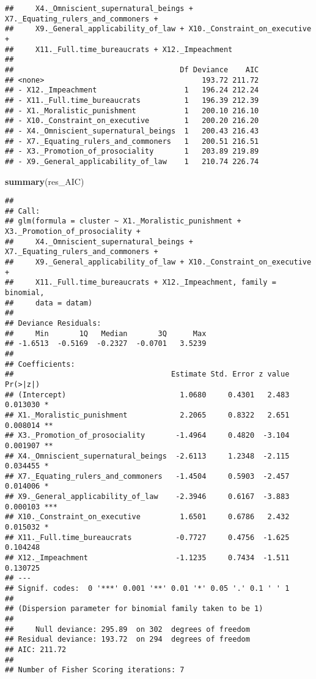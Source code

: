 \documentclass[
]{article}
\newenvironment{Shaded}{\begin{snugshade}}{\end{snugshade}}
\newcommand{\KeywordTok}[1]{\textcolor[rgb]{0.13,0.29,0.53}{\textbf{#1}}}
\newcommand{\NormalTok}[1]{#1}
\begin{document}
\begin{verbatim}
##     X4._Omniscient_supernatural_beings + X7._Equating_rulers_and_commoners + 
##     X9._General_applicability_of_law + X10._Constraint_on_executive + 
##     X11._Full.time_bureaucrats + X12._Impeachment
## 
##                                      Df Deviance    AIC
## <none>                                    193.72 211.72
## - X12._Impeachment                    1   196.24 212.24
## - X11._Full.time_bureaucrats          1   196.39 212.39
## - X1._Moralistic_punishment           1   200.10 216.10
## - X10._Constraint_on_executive        1   200.20 216.20
## - X4._Omniscient_supernatural_beings  1   200.43 216.43
## - X7._Equating_rulers_and_commoners   1   200.51 216.51
## - X3._Promotion_of_prosociality       1   203.89 219.89
## - X9._General_applicability_of_law    1   210.74 226.74
\end{verbatim}

\begin{Shaded}
\begin{Highlighting}[]
\KeywordTok{summary}\NormalTok{(res_AIC)}
\end{Highlighting}
\end{Shaded}

\begin{verbatim}
## 
## Call:
## glm(formula = cluster ~ X1._Moralistic_punishment + X3._Promotion_of_prosociality + 
##     X4._Omniscient_supernatural_beings + X7._Equating_rulers_and_commoners + 
##     X9._General_applicability_of_law + X10._Constraint_on_executive + 
##     X11._Full.time_bureaucrats + X12._Impeachment, family = binomial, 
##     data = datam)
## 
## Deviance Residuals: 
##     Min       1Q   Median       3Q      Max  
## -1.6513  -0.5169  -0.2327  -0.0701   3.5239  
## 
## Coefficients:
##                                    Estimate Std. Error z value Pr(>|z|)    
## (Intercept)                          1.0680     0.4301   2.483 0.013030 *  
## X1._Moralistic_punishment            2.2065     0.8322   2.651 0.008014 ** 
## X3._Promotion_of_prosociality       -1.4964     0.4820  -3.104 0.001907 ** 
## X4._Omniscient_supernatural_beings  -2.6113     1.2348  -2.115 0.034455 *  
## X7._Equating_rulers_and_commoners   -1.4504     0.5903  -2.457 0.014006 *  
## X9._General_applicability_of_law    -2.3946     0.6167  -3.883 0.000103 ***
## X10._Constraint_on_executive         1.6501     0.6786   2.432 0.015032 *  
## X11._Full.time_bureaucrats          -0.7727     0.4756  -1.625 0.104248    
## X12._Impeachment                    -1.1235     0.7434  -1.511 0.130725    
## ---
## Signif. codes:  0 '***' 0.001 '**' 0.01 '*' 0.05 '.' 0.1 ' ' 1
## 
## (Dispersion parameter for binomial family taken to be 1)
## 
##     Null deviance: 295.89  on 302  degrees of freedom
## Residual deviance: 193.72  on 294  degrees of freedom
## AIC: 211.72
## 
## Number of Fisher Scoring iterations: 7
\end{verbatim}
\end{document}
